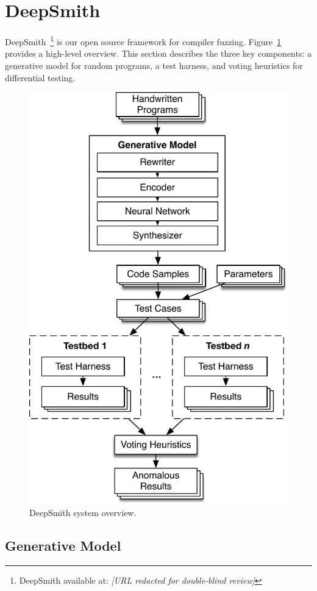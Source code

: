 \section{DeepSmith}

DeepSmith~\footnote{DeepSmith available at: \emph{[URL redacted for double-blind review]}} is our open source framework for compiler fuzzing. Figure~\ref{fig:deeptune} provides a high-level overview. This section describes the three key components: a generative model for random programs, a test harness, and voting heuristics for differential testing.

\begin{figure}
  \centering
  \includegraphics[width=.80\columnwidth]{img/deepsmith} %
  \caption{%
    DeepSmith system overview.
  }%
  \label{fig:deeptune}
\end{figure}

\subsection{Generative Model}

